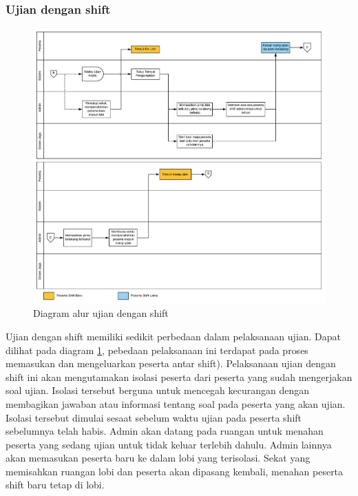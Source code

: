     \subsubsection{Ujian dengan shift}
        \begin{figure}
            \centering
            \includegraphics[width=0.75\paperwidth]{Gambar/flowchart/exam-flow-ujian-shift.pdf}
            \caption{Diagram alur ujian dengan shift}
            \label{fig:flowchart-exam-exam-with-shift}
        \end{figure}
        Ujian dengan shift memiliki sedikit perbedaan dalam pelaksanaan ujian.
        Dapat dilihat pada diagram \ref{fig:flowchart-exam-exam-with-shift},
        pebedaan pelaksanaan ini terdapat pada proses memasukan dan mengeluarkan
        peserta antar shift). Pelaksanaan ujian dengan shift ini akan
        mengutamakan isolasi peserta dari peserta yang sudah mengerjakan soal
        ujian. Isolasi tersebut berguna untuk mencegah kecurangan dengan
        membagikan jawaban atau informasi tentang soal pada peserta yang akan
        ujian. Isolasi tersebut dimulai sesaat sebelum waktu ujian pada peserta
        shift sebelumnya telah habis. Admin akan datang pada ruangan untuk
        menahan peserta yang sedang ujian untuk tidak keluar terlebih dahulu.
        Admin lainnya akan memasukan peserta baru ke dalam lobi yang terisolasi.
        Sekat yang memisahkan ruangan lobi dan peserta akan dipasang kembali,
        menahan peserta shift baru tetap di lobi.
        
